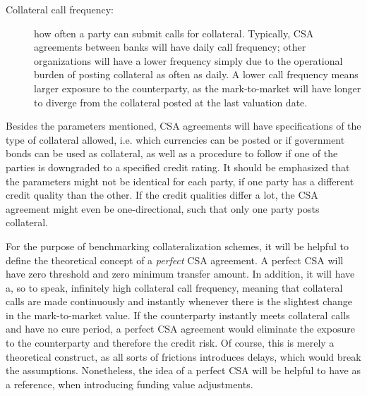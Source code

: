 \documentclass[main.tex]{subfiles}
\begin{document}
\begin{description}
            \item[Collateral call frequency:]
            how often a party can submit calls for collateral.
            Typically, CSA agreements between banks will have daily call frequency;
            other organizations will have a lower frequency simply due to the operational burden
            of posting collateral as often as daily. 
            A lower call frequency means larger exposure to the counterparty,
            as the mark-to-market will have longer to diverge from the collateral posted 
            at the last valuation date.
        \end{description}

        Besides the parameters mentioned, CSA agreements will have specifications of the type of collateral allowed,
        i.e. which currencies can be posted or if government bonds can be used as collateral,
        as well as a procedure to follow if one of the parties is downgraded to a specified credit rating.
        It should be emphasized that the parameters might not be identical for each party,
        if one party has a different credit quality than the other.
        If the credit qualities differ a lot, the CSA agreement might even be one-directional,
        such that only one party posts collateral.

        For the purpose of benchmarking collateralization schemes, 
        it will be helpful to define the theoretical concept of a \textit{perfect} CSA agreement.
        A perfect CSA will have zero threshold and zero minimum transfer amount.
        In addition, it will have a, so to speak, infinitely high collateral call frequency,
        meaning that collateral calls are made continuously and instantly 
        whenever there is the slightest change in the mark-to-market value. 
        If the counterparty instantly meets collateral calls and have no cure period,
        a perfect CSA agreement would eliminate the exposure to the counterparty
        and therefore the credit risk.
        Of course, this is merely a theoretical construct, as all sorts of frictions introduces delays,
        which would break the assumptions.
        Nonetheless, the idea of a perfect CSA will be helpful to have as a reference,
        when introducing funding value adjustments.
\end{document}
